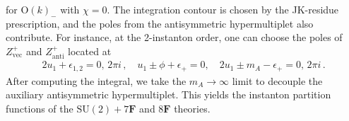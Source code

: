 \documentclass[11pt, a4paper]{article}
\theoremstyle{definition}
\begin{document}
for $ \mathrm{O}(k)_- $ with $ \chi=0 $. The integration contour is chosen by the JK-residue prescription, and the poles from the antisymmetric hypermultiplet also contribute. For instance, at the 2-instanton order, one can choose the poles of $ Z_{\mathrm{vec}}^+ $ and $ Z_{\mathrm{anti}}^+ $ located at
\begin{align}
    2u_1 + \epsilon_{1,2} = 0 , \, 2\pi i \, , \quad
    u_1 \pm \phi + \epsilon_+ = 0  , \quad
    2u_1 \pm m_A - \epsilon_+ = 0 , \, 2\pi i \, .
\end{align}
After computing the integral, we take the $ m_A \to \infty $ limit to decouple the auxiliary antisymmetric hypermultiplet. This yields the instanton partition functions of the $ \mathrm{SU}(2)+7\mathbf{F} $ and $ 8\mathbf{F} $ theories.






\end{document}
